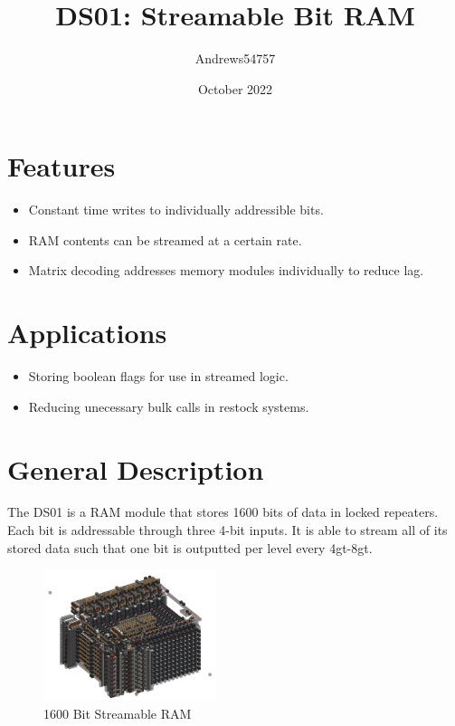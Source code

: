 \documentclass[10pt]{datasheet}
\title{DS01: Streamable Bit RAM}
\author{Andrews54757}
\date{October 2022}
\begin{document}
\maketitle

\section{Features}

\begin{itemize}
\item{Constant time writes to individually addressible bits.}
\item{RAM contents can be streamed at a certain rate.}
\item{Matrix decoding addresses memory modules individually to reduce lag.}
\end{itemize}

\section{Applications}

\begin{itemize}
\item{Storing boolean flags for use in streamed logic.}
\item{Reducing unecessary bulk calls in restock systems.}
\end{itemize}

\section{General Description}
The DS01 is a RAM module that stores 1600 bits of data in locked repeaters. Each bit is addressable through three 4-bit inputs. It is able to stream all of its stored data such that one bit is outputted per level every 4gt-8gt.

\vfill\break

\begin{figure}[h]
    \includegraphics[width=0.45\textwidth]{sram.png}
    \caption{1600 Bit Streamable RAM}
\end{figure}
\end{document}
